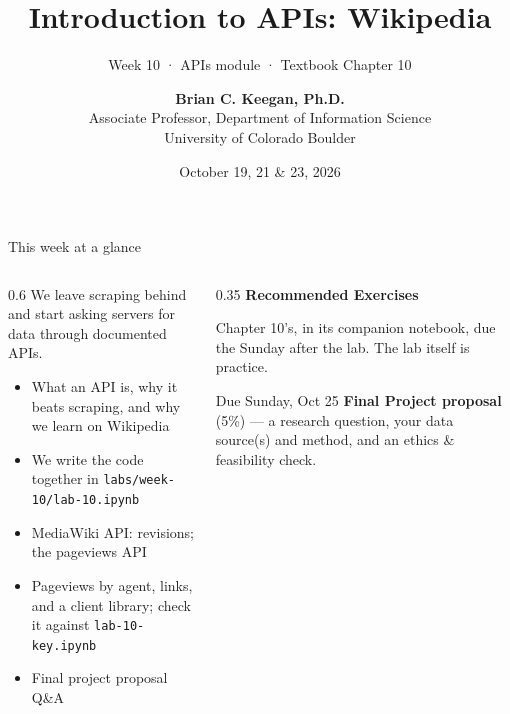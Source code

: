 \documentclass[9pt,aspectratio=169]{beamer}
\title[Week 10 · Wikipedia API]{{\Huge Introduction to APIs: Wikipedia}}
\subtitle{Week 10 · APIs module · Textbook Chapter 10}
\author[Keegan]{\textbf{Brian C. Keegan, Ph.D.} \\ Associate Professor, Department of Information Science \\ University of Colorado Boulder}
\date{October 19, 21 \& 23, 2026}
\begin{document}
\maketitle

\begin{frame}{This week at a glance}
    \begin{columns}[T]
        \begin{column}{0.6\textwidth}
            We leave scraping behind and start asking servers for data through documented APIs.

            \bigskip

            \begin{itemize}\small
                \item What an API is, why it beats scraping, and why we learn on Wikipedia
                \item We write the code together in \texttt{labs/week-10/lab-10.ipynb}
            \end{itemize}

            \medskip

            \begin{itemize}\small
                \item MediaWiki API: revisions; the pageviews API
            \end{itemize}

            \medskip

            \begin{itemize}\small
                \item Pageviews by agent, links, and a client library; check it against \texttt{lab-10-key.ipynb}
                \item Final project proposal Q\&A
            \end{itemize}
        \end{column}
        \begin{column}{0.35\textwidth}
            \textbf{Recommended Exercises}\\[2pt]
            {\footnotesize Chapter 10's, in its companion notebook, due the Sunday after the lab. The lab itself is practice.\par}
            \medskip
            \begin{alertblock}{Due Sunday, Oct 25}
                \footnotesize \textbf{Final Project proposal} (5\%) --- a research question, your data source(s) and method, and an ethics \& feasibility check.
            \end{alertblock}
        \end{column}
    \end{columns}
\end{frame}
\end{document}

